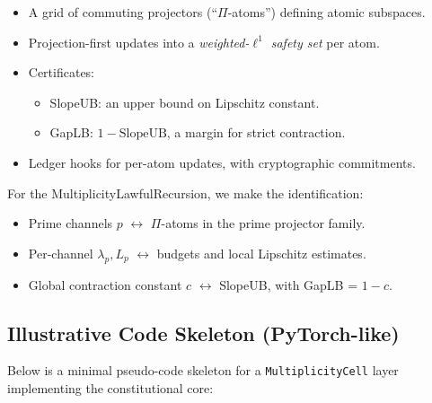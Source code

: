 \documentclass[11pt]{article}
\begin{document}
\begin{itemize}[leftmargin=1.5em]
  \item A grid of commuting projectors (``$\Pi$-atoms'') defining atomic subspaces.
  \item Projection-first updates into a \emph{weighted-$\ell^1$ safety set} per atom.
  \item Certificates:
    \begin{itemize}
      \item SlopeUB: an upper bound on Lipschitz constant.
      \item GapLB: $1-\text{SlopeUB}$, a margin for strict contraction.
    \end{itemize}
  \item Ledger hooks for per-atom updates, with cryptographic commitments.
\end{itemize}

For the MultiplicityLawfulRecursion, we make the identification:
\begin{itemize}[leftmargin=1.5em]
  \item Prime channels $p$ \(\leftrightarrow\) $\Pi$-atoms in the prime projector family.
  \item Per-channel $\lambda_p, L_p$ \(\leftrightarrow\) budgets and local Lipschitz estimates.
  \item Global contraction constant $c$ \(\leftrightarrow\) SlopeUB, with GapLB = $1-c$.
\end{itemize}

\subsection{Illustrative Code Skeleton (PyTorch-like)}

Below is a minimal pseudo-code skeleton for a \texttt{MultiplicityCell} layer implementing the constitutional core:
\end{document}
